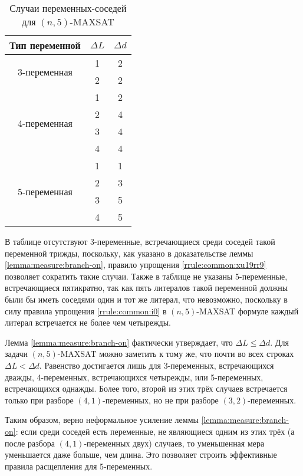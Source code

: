 \begin{table}[ht]
 \centering
 \caption{Случаи переменных-соседей для $(n,5)$-MAXSAT}
 \begin{tabular}{|c|c|c|}
  \hline
  Тип переменной & $\Delta L$ & $\Delta d$ \\
  \hline\hline
  \multirow{2}{*}{3-переменная}
                 & 1          & 2 \\
                 & 2          & 2 \\
  \hline
  \multirow{4}{*}{4-переменная}
                 & 1          & 2 \\
                 & 2          & 4 \\
                 & 3          & 4 \\
                 & 4          & 4 \\
  \hline
  \multirow{4}{*}{5-переменная}
                 & 1          & 1 \\
                 & 2          & 3 \\
                 & 3          & 5 \\
                 & 4          & 5 \\
  \hline
 \end{tabular}
 \label{table:n5:varcases}
\end{table}

В таблице отсутствуют 3-переменные, встречающиеся среди соседей такой переменной трижды, поскольку, как указано в доказательстве леммы \ref{lemma:measure:branch-on}, правило упрощения \ref{rrule:common:xu19rr9} позволяет сократить такие случаи. Также в таблице не указаны 5-переменные, встречающиеся пятикратно, так как пять литералов такой переменной должны были бы иметь соседями один и тот же литерал, что невозможно, поскольку в силу правила упрощения \ref{rrule:common:i0} в $(n,5)$-MAXSAT формуле каждый литерал встречается не более чем четырежды.

Лемма \ref{lemma:measure:branch-on} фактически утверждает, что $\Delta L \leq \Delta d$. Для задачи $(n,5)$-MAXSAT можно заметить к тому же, что почти во всех строках $\Delta L < \Delta d$. Равенство достигается лишь для 3-переменных, встречающихся дважды, 4-переменных, встречающихся четырежды, или 5-переменных, встречающихся однажды. Более того, второй из этих трёх случаев встречается только при разборе $(4,1)$-переменных, но не при разборе $(3,2)$-переменных.

Таким образом, верно неформальное усиление леммы \ref{lemma:measure:branch-on}: если среди соседей есть переменные, не являющиеся одним из этих трёх (а после разбора $(4,1)$-переменных двух) случаев, то уменьшенная мера уменьшается даже больше, чем длина. Это позволяет строить эффективные правила расщепления для 5-переменных.

